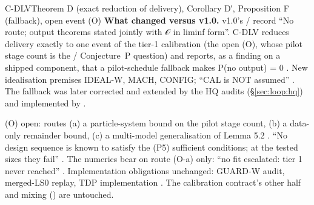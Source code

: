 \begin{card}{C-DLV}{Theorem D (exact reduction of delivery), Corollary D′, Proposition F (fallback), open event (O)}
\textbf{What changed versus v1.0.} v1.0's  /  record ``No route; output theorems stated jointly with 𝒪 in liminf form''. C-DLV reduces delivery exactly to one event of the tier-1 calibration (the open (O), whose pilot stage count is the  / Conjecture~P question) and reports, as a finding on a shipped component, that a pilot-schedule fallback makes P(no output) = 0 . New idealisation premises IDEAL-W, MACH, CONFIG; ``CAL is NOT assumed'' . The fallback was later corrected and extended by the HQ audits (\S\ref{sec:loop:hq}) and implemented by .

\begin{notproved}
(O) open: routes (a) a particle-system bound on the pilot stage count, (b) a data-only remainder bound, (c) a multi-model generalisation of Lemma 5.2 . ``No design sequence is known to satisfy the (P5) sufficient conditions; at the tested sizes they fail'' . The numerics bear on route (O-a) only: ``no fit escalated: tier 1 never reached'' . Implementation obligations unchanged: GUARD-W audit, merged-LS0 replay, TDP implementation . The calibration contract's other half and mixing () are untouched.
\end{notproved}
\end{card}

